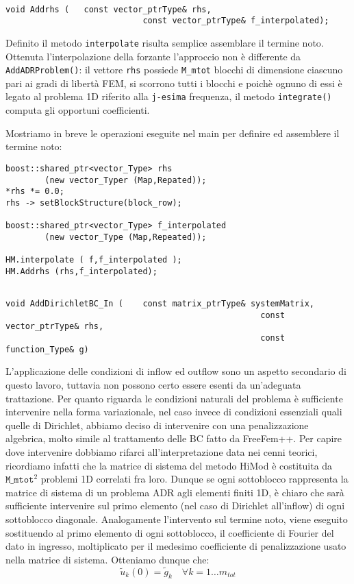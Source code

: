 \begin{lstlisting}[style=general, frame = none]

void Addrhs	(	const vector_ptrType& rhs,
							const vector_ptrType& f_interpolated);
\end{lstlisting}
Definito il metodo \texttt{interpolate} risulta semplice assemblare il termine noto. Ottenuta l'interpolazione della forzante l'approccio non 
\`e differente da \texttt{AddADRProblem()}: il vettore \texttt{rhs} possiede \texttt{M\_mtot} blocchi di dimensione ciascuno pari ai gradi di 
libert\`a FEM, si scorrono tutti i blocchi e poich\`e ognuno di essi \`e legato al problema 1D riferito alla \texttt{j-esima} frequenza, il 
metodo \texttt{integrate()} computa gli opportuni coefficienti.

Mostriamo in breve le operazioni eseguite nel main per definire ed assemblere il termine noto:
\begin{lstlisting}[style = general,frame=bottomline]
boost::shared_ptr<vector_Type> rhs 
		(new vector_Typer (Map,Repated));
*rhs *= 0.0;
rhs -> setBlockStructure(block_row);

boost::shared_ptr<vector_Type> f_interpolated 
		(new vector_Type (Map,Repeated));

HM.interpolate ( f,f_interpolated );
HM.Addrhs (rhs,f_interpolated);
\end{lstlisting}

\begin{lstlisting}[style = general,frame = none]

void AddDirichletBC_In (	const matrix_ptrType& systemMatrix,
													const vector_ptrType& rhs,
													const function_Type& g)
\end{lstlisting}

L'applicazione delle condizioni di inflow ed outflow sono un aspetto secondario di questo lavoro, tuttavia non possono certo essere esenti da 
un'adeguata trattazione. Per quanto riguarda le condizioni naturali del problema \`e sufficiente intervenire nella forma variazionale, nel caso 
invece di condizioni essenziali quali quelle di Dirichlet, abbiamo deciso di intervenire con una penalizzazione algebrica, molto simile al 
trattamento delle BC fatto da FreeFem++. Per capire dove intervenire dobbiamo rifarci all'interpretazione data nei cenni teorici, ricordiamo 
infatti che la matrice di sistema del metodo HiMod \`e costituita da $\texttt{M\_mtot}^2$ problemi 1D correlati fra loro. Dunque se ogni 
sottoblocco rappresenta la matrice di sistema di un problema ADR agli elementi finiti 1D, \`e chiaro che sar\`a sufficiente intervenire sul 
primo elemento (nel caso di Dirichlet all'inflow) di ogni sottoblocco diagonale. Analogamente l'intervento sul termine noto, viene eseguito sostituendo al primo elemento di 
ogni sottoblocco, il coefficiente 
di Fourier del dato in ingresso, moltiplicato per il medesimo coefficiente di penalizzazione usato nella matrice di sistema. Otteniamo dunque che:
\begin{equation}
\label{eq: inflow}
\tilde u_k(0)=\tilde g_k \quad \forall k = 1 \ldots m_{tot}
\end{equation}

